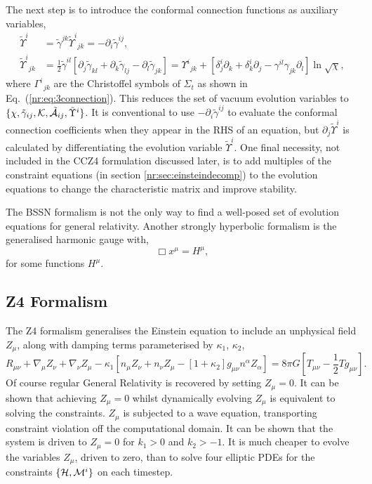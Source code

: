 The next step is to introduce the conformal connection functions as auxiliary variables, 
\begin{align} 
\tilde{\Upsilon}^i &= \tilde{\gamma}^{jk}\tilde{\Upsilon}^i_{\,\;jk} = -\partial_i \tilde{\gamma}^{ij},\\
 \tilde{\Upsilon}^i_{\,\;jk} &= \frac{1}{2}\tilde{\gamma}^{il}\left[ \partial_j \tilde{\gamma}_{kl} + \partial_k \tilde{\gamma}_{lj} - \partial_l \tilde{\gamma}_{jk}\right] = \Upsilon^i_{\;\,jk} + \left[ \delta^i_j \partial_k + \delta^i_k \partial_j - \gamma^{il}\gamma_{jk}\partial_l\right] \ln \sqrt{\chi},
 \end{align}
where $\Gamma^i_{\,\,\,jk}$ are the Christoffel symbols of $\Sigma_t$ as shown in Eq.~(\ref{nr:eq:3connection}).
This reduces the set of vacuum evolution variables to $\{\chi,\tilde{\gamma}_{ij},\mathcal{K},\tilde{\mathcal{A}}_{ij},\tilde{\Upsilon}^i \}$. It is conventional to use $-\partial_i \tilde{\gamma}^{ij}$ to evaluate the conformal connection coefficients when they appear in the RHS of an equation, but $\partial_j \tilde{\Upsilon}^i$ is calculated by differentiating the evolution variable $\tilde{\Upsilon}^i$. One final necessity, not included in the CCZ4 formulation discussed later, is to add multiples of the constraint equations (in section \ref{nr:sec:einsteindecomp}) to the evolution equations to change the characteristic matrix and improve stability. 

The BSSN formalism is not the only way to find a well-posed set of evolution equations for general relativity. Another strongly hyperbolic formalism is the generalised harmonic gauge \cite{Garfinkle:2001ni} \cite{garfinkle2002harmonic} \cite{Pretorius:2004jg} \cite{Pretorius:2005gq} with, 
\begin{equation}\Box x^\mu = H^\mu,\end{equation}
for some functions $H^\mu$.


\subsection{Z4 Formalism}
The Z4 formalism \cite{gundlach2005constraint} generalises the Einstein equation to include an unphysical field $Z_\mu$, along with damping terms parameterised by $\kappa_1$, $\kappa_2$, 
\begin{equation}\label{nr:eq:z4einstein} R_{\mu\nu} + \nabla_\mu Z_\nu + \nabla_\nu Z_\mu - \kappa_1\left[ n_\mu Z_\nu + n_\nu Z_\mu - [1+\kappa_2]g_{\mu\nu}n^\alpha Z_\alpha\right] = 8\pi G \left[T_{\mu\nu}- \frac{1}{2}Tg_{\mu\nu} \right].\end{equation}
Of course regular General Relativity is recovered by setting $Z_\mu=0$. It can be shown that achieving $Z_\mu=0$ whilst dynamically evolving $Z_\mu$  is equivalent to solving the constraints. $Z_\mu$ is subjected to a wave equation, transporting constraint violation off the computational domain. It can be shown that the system is driven to $Z_\mu =0$ for $k_1>0$ and $k_2>-1$. It is much cheaper to evolve the variables $Z_\mu$, driven to zero, than to solve four elliptic PDEs for the constraints $\{\mathcal{H},\mathcal{M}^i\}$ on each timestep. 


